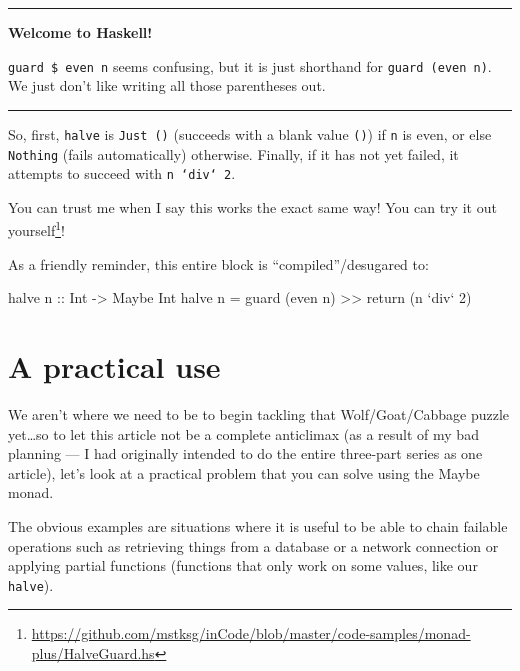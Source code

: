 \documentclass[]{article}
\newenvironment{Shaded}{}{}
\newcommand{\DataTypeTok}[1]{\textcolor[rgb]{0.56,0.13,0.00}{{#1}}}
\newcommand{\DecValTok}[1]{\textcolor[rgb]{0.25,0.63,0.44}{{#1}}}
\newcommand{\OtherTok}[1]{\textcolor[rgb]{0.00,0.44,0.13}{{#1}}}
\newcommand{\FunctionTok}[1]{\textcolor[rgb]{0.02,0.16,0.49}{{#1}}}
\newcommand{\NormalTok}[1]{{#1}}
\renewcommand{\href}[2]{#2\footnote{\url{#1}}}
\begin{document}
\begin{center}\rule{0.5\linewidth}{\linethickness}\end{center}

\textbf{Welcome to Haskell!}

\texttt{guard\ \$\ even\ n} seems confusing, but it is just shorthand
for \texttt{guard\ (even\ n)}. We just don't like writing all those
parentheses out.

\begin{center}\rule{0.5\linewidth}{\linethickness}\end{center}

So, first, \texttt{halve} is \texttt{Just\ ()} (succeeds with a blank
value \texttt{()}) if \texttt{n} is even, or else \texttt{Nothing}
(fails automatically) otherwise. Finally, if it has not yet failed, it
attempts to succeed with \texttt{n\ `div`\ 2}.

You can trust me when I say this works the exact same way! You can
\href{https://github.com/mstksg/inCode/blob/master/code-samples/monad-plus/HalveGuard.hs}{try
it out yourself}!

As a friendly reminder, this entire block is ``compiled''/desugared to:

\begin{Shaded}
\begin{Highlighting}[]
\NormalTok{halve}\OtherTok{ n ::} \DataTypeTok{Int} \OtherTok{->} \DataTypeTok{Maybe} \DataTypeTok{Int}
\NormalTok{halve n }\FunctionTok{=} \NormalTok{guard (even n) }\FunctionTok{>>} \NormalTok{return (n }\OtherTok{`div`} \DecValTok{2}\NormalTok{)}
\end{Highlighting}
\end{Shaded}

\section{A practical use}\label{a-practical-use}

We aren't where we need to be to begin tackling that Wolf/Goat/Cabbage
puzzle yet\ldots{}so to let this article not be a complete anticlimax
(as a result of my bad planning --- I had originally intended to do the
entire three-part series as one article), let's look at a practical
problem that you can solve using the Maybe monad.

The obvious examples are situations where it is useful to be able to
chain failable operations such as retrieving things from a database or a
network connection or applying partial functions (functions that only
work on some values, like our \texttt{halve}).
\end{document}
